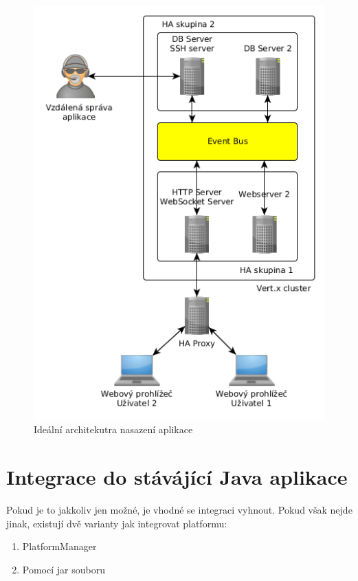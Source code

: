 \begin{figure}
\begin{centering}
\includegraphics[scale=0.5]{obrazky/architecture_ideal}
\par\end{centering}
\caption{Ideální architekutra nasazení aplikace\label{fig:architecture_ideal}}
\end{figure}

\section{Integrace do stávájící Java aplikace}

Pokud je to jakkoliv jen možné, je vhodné se integraci vyhnout. Pokud však nejde jinak, existují dvě varianty jak integrovat platformu:

\begin{enumerate}
\item PlatformManager
\item Pomocí jar souboru
\end{enumerate}

